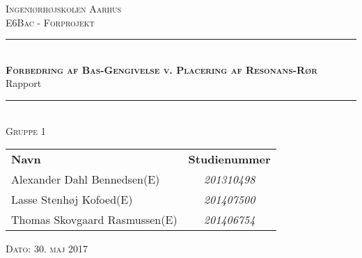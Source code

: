 \newcommand{\HRule}{\rule{\linewidth}{0.1mm}} %

\thispagestyle{empty}
\begin{center}
	\textsc{\LARGE Ingeniørhøjskolen Aarhus}\\[1.5cm] %

	
	\textsc{\large E6Bac - Forprojekt}\\[2.5cm] 
	\HRule \\[0.8cm]
	{\huge \bfseries \textsc{Forbedring af Bas-Gengivelse v. Placering af Resonans-Rør}} \\[0.5cm]{\LARGE Rapport} \\[0.4cm]
	\HRule \\[1.5cm]
	
	\textsc{\large Gruppe 1}\\
	\vspace{0.5 in}
	\begin{center}
		\begin{tabular}{l c}
			\textbf{Navn} & \textbf{Studienummer} \\
			Alexander Dahl Bennedsen(E) & \textsl{201310498}    \\
			Lasse Stenhøj Kofoed(E) & \textsl{201407500}  \\
			Thomas Skovgaard Rasmussen(E) & \textsl{201406754}
			
			
		\end{tabular}
	\end{center}
	\vspace{0.5 in}
	
	\vspace{0.5 in}
	
	\textsc{\large Dato: 30. maj 2017}\\
	
\end{center} %

\newpage